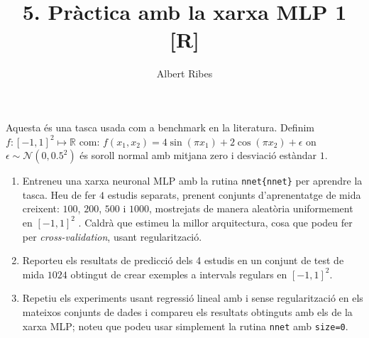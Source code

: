 \documentclass[a4paper]{article}
\author{Albert Ribes}
\title{\textbf{5. Pràctica amb la xarxa MLP 1 [R]}}
\begin{document}
    \maketitle

    Aquesta és una tasca usada com a benchmark en la literatura. Definim
    $f:
    [-1, 1]^2
    \longmapsto
    \mathbb{R} $
    com:
    $f(x_1, x_2) =
    4\sin(\pi x_1) +
    2\cos(\pi x_2 ) +
    \epsilon$
    on
    $\epsilon \sim \mathcal{N}(0, 0.5^2)$
    és soroll normal amb mitjana zero i desviació estàndar
    $1$.

    \begin{enumerate}

        \item Entreneu una xarxa neuronal MLP amb la rutina
        \texttt{nnet\{nnet\}}
        per aprendre la tasca. Heu de fer $4$
        estudis separats, prenent conjunts d'aprenentatge de mida creixent:
            $100$, $200$, $500$ i $1000$, mostrejats
        de manera aleatòria uniformement en
        $[-1, 1]^2$ .
        Caldrà que estimeu la millor arquitectura, cosa que
        podeu fer per \textit{cross-validation}, usant regularització.
        \item Reporteu els resultats de predicció dels 4 estudis en un conjunt de test de mida $1024$
        obtingut de
        crear exemples a intervals regulars en
        $[-1, 1]^2$.

        \item Repetiu els experiments usant regressió lineal amb i sense regularització en els mateixos conjunts
        de dades i compareu els resultats obtinguts amb els de la xarxa MLP; noteu que podeu usar
        simplement la rutina
        \texttt{nnet}
        amb
        \texttt{size=0}.
    \end{enumerate}
\end{document}
